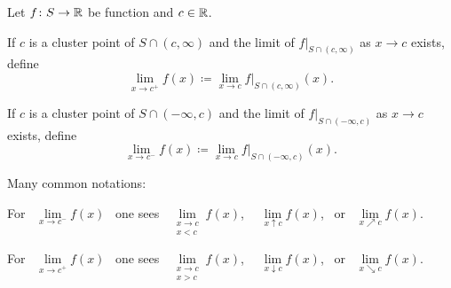 \documentclass[10pt,aspectratio=169]{beamer}
\begin{document}
\begin{frame}

\begin{definition}
Let $f \colon S \to {\mathbb{R}}$ be function and $c \in {\mathbb{R}}$.

\pause
\medskip

If $c$ is a cluster point of $S \cap (c,\infty)$ and the limit
of $f|_{S \cap (c,\infty)}$ 
as $x \to c$ exists, define
\begin{equation*}
\lim_{x \to c^+} f(x) \coloneqq \lim_{x\to c} f|_{S \cap (c,\infty)}(x) .
\end{equation*}

\pause
If $c$ is a cluster point of 
$S \cap (-\infty,c)$ and the limit
of $f|_{S \cap (-\infty,c)}$ 
as $x \to c$ exists, define
\begin{equation*}
\lim_{x \to c^-} f(x) \coloneqq \lim_{x\to c} f|_{S \cap (-\infty,c)}(x) .
\end{equation*}
\end{definition}

\pause
Many common notations: 

\medskip

For
~$\lim\limits_{x \to c^-} f(x)$~ one sees
~$\lim\limits_{\substack{x \to c\\x < c}} f(x)$,~
~$\lim\limits_{x \uparrow c} f(x)$,~ or
~$\lim\limits_{x \nearrow c} f(x)$.

\medskip

For
~$\lim\limits_{x \to c^+} f(x)$~ one sees
~$\lim\limits_{\substack{x \to c\\x > c}} f(x)$,~
~$\lim\limits_{x \downarrow c} f(x)$,~ or
~$\lim\limits_{x \searrow c} f(x)$.


\end{frame}
\end{document}
